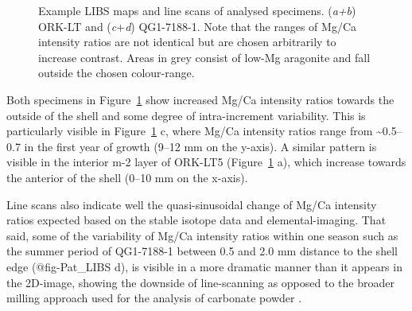 \documentclass[
  authoryear,
  preprint,
  3p]{elsarticle}
\begin{document}
\begin{figure}


\caption{\label{fig-Pat_LIBS}Example LIBS maps and line scans of
analysed specimens. (\emph{a+b}) ORK-LT and (\emph{c}+\emph{d})
QG1-7188-1. Note that the ranges of Mg/Ca intensity ratios are not
identical but are chosen arbitrarily to increase contrast. Areas in grey
consist of low-Mg aragonite and fall outside the chosen colour-range.}

\end{figure}%

Both specimens in Figure~\ref{fig-Pat_LIBS} show increased Mg/Ca
intensity ratios towards the outside of the shell and some degree of
intra-increment variability. This is particularly visible in
Figure~\ref{fig-Pat_LIBS} c, where Mg/Ca intensity ratios range from
\textasciitilde0.5--0.7 in the first year of growth (9--12 mm on the
y-axis). A similar pattern is visible in the interior m-2 layer of
ORK-LT5 (Figure~\ref{fig-Pat_LIBS} a), which increase towards the
anterior of the shell (0--10 mm on the x-axis).

Line scans also indicate well the quasi-sinusoidal change of Mg/Ca
intensity ratios expected based on the stable isotope data and
elemental-imaging. That said, some of the variability of Mg/Ca intensity
ratios within one season such as the summer period of QG1-7188-1 between
0.5 and 2.0 mm distance to the shell edge (@fig-Pat\_LIBS d), is visible
in a more dramatic manner than it appears in the 2D-image, showing the
downside of line-scanning as opposed to the broader milling approach
used for the analysis of carbonate powder \citep{Ferguson2011-zl}.
\end{document}
